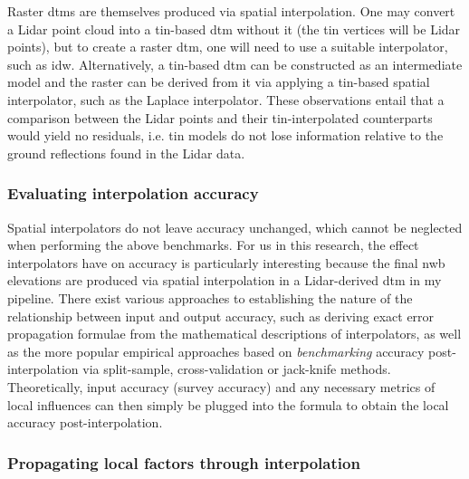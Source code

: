 Raster \ac{dtm}s are themselves produced via spatial interpolation. One may convert a Lidar point cloud into a \ac{tin}-based \ac{dtm} without it (the \ac{tin} vertices will be Lidar points), but to create a raster \ac{dtm}, one will need to use a suitable interpolator, such as \ac{idw}. Alternatively, a \ac{tin}-based \ac{dtm} can be constructed as an intermediate model and the raster can be derived from it via applying a \ac{tin}-based spatial interpolator, such as the Laplace interpolator. These observations entail that a comparison between the Lidar points and their \ac{tin}-interpolated counterparts would yield no residuals, i.e. \ac{tin} models do not lose information relative to the ground reflections found in the Lidar data.

\subsubsection{Evaluating interpolation accuracy}

Spatial interpolators do not leave accuracy unchanged, which cannot be neglected when performing the above benchmarks. For us in this research, the effect interpolators have on accuracy is particularly interesting because the final \ac{nwb} elevations are produced via spatial interpolation in a Lidar-derived \ac{dtm} in my pipeline. There exist various approaches to establishing the nature of the relationship between input and output accuracy, such as deriving exact error propagation formulae from the mathematical descriptions of interpolators, as well as the more popular empirical approaches based on \textit{benchmarking} accuracy post-interpolation via split-sample, cross-validation or jack-knife methods. Theoretically, input accuracy (survey accuracy) and any necessary metrics of local influences can then simply be plugged into the formula to obtain the local accuracy post-interpolation.

\subsubsection{Propagating local factors through interpolation}

